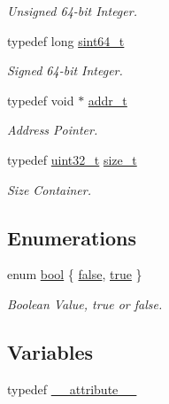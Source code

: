 \begin{DoxyCompactItemize}
\begin{DoxyCompactList}\small\item\em Unsigned 64-\/bit Integer. \end{DoxyCompactList}\item 
typedef long \hyperlink{a00032_a04761b9e7480e1e48b0d392da17fd5d4_a04761b9e7480e1e48b0d392da17fd5d4}{sint64\+\_\+t}
\begin{DoxyCompactList}\small\item\em Signed 64-\/bit Integer. \end{DoxyCompactList}\item 
typedef void $\ast$ \hyperlink{a00032_aa0015d6dd7c46f7b7a2ff7b5bf407f5c_aa0015d6dd7c46f7b7a2ff7b5bf407f5c}{addr\+\_\+t}
\begin{DoxyCompactList}\small\item\em Address Pointer. \end{DoxyCompactList}\item 
typedef \hyperlink{a00032_a435d1572bf3f880d55459d9805097f62_a435d1572bf3f880d55459d9805097f62}{uint32\+\_\+t} \hyperlink{a00032_a29d85914ddff32967d85ada69854206d_a29d85914ddff32967d85ada69854206d}{size\+\_\+t}
\begin{DoxyCompactList}\small\item\em Size Container. \end{DoxyCompactList}\end{DoxyCompactItemize}
\subsection*{Enumerations}
\begin{DoxyCompactItemize}
\item 
enum \hyperlink{a00032_af6a258d8f3ee5206d682d799316314b1_af6a258d8f3ee5206d682d799316314b1}{bool} \{ \hyperlink{a00032_af6a258d8f3ee5206d682d799316314b1_af6a258d8f3ee5206d682d799316314b1ae9de385ef6fe9bf3360d1038396b884c}{false}, 
\hyperlink{a00032_af6a258d8f3ee5206d682d799316314b1_af6a258d8f3ee5206d682d799316314b1a08f175a5505a10b9ed657defeb050e4b}{true}
 \}\begin{DoxyCompactList}\small\item\em Boolean Value, true or false. \end{DoxyCompactList}
\end{DoxyCompactItemize}
\subsection*{Variables}
\begin{DoxyCompactItemize}
\item 
typedef \hyperlink{a00032_acf8c839d8a7a12772ebd4b8a4c087034_acf8c839d8a7a12772ebd4b8a4c087034}{\+\_\+\+\_\+attribute\+\_\+\+\_\+}
\end{DoxyCompactItemize}


